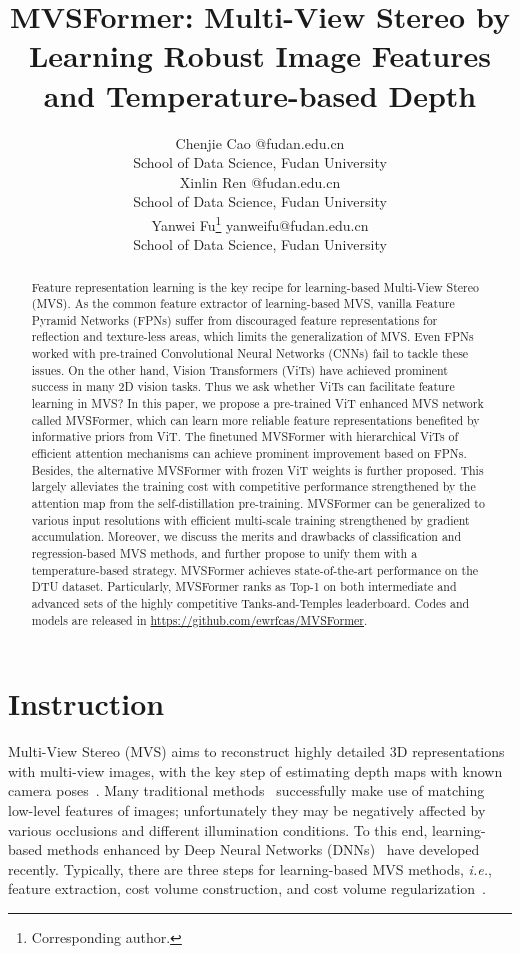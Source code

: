 \documentclass[10pt]{article} \usepackage[preprint]{tmlr}
\title{MVSFormer: Multi-View Stereo by Learning Robust Image Features and Temperature-based Depth}
\author{\name Chenjie Cao \email 20110980001@fudan.edu.cn \\
        \addr School of Data Science, Fudan University \\
        \AND
        \name Xinlin Ren \email 20110240015@fudan.edu.cn \\
        \addr School of Data Science, Fudan University \\
        \AND
        \name Yanwei Fu\thanks{Corresponding author.} \email yanweifu@fudan.edu.cn\\
        \addr School of Data Science, Fudan University}
\begin{document}
\maketitle

\begin{abstract}
Feature representation learning is the key recipe for learning-based Multi-View Stereo (MVS). As the common feature extractor of learning-based MVS, vanilla Feature Pyramid Networks (FPNs) suffer from discouraged feature representations for reflection and texture-less areas, which limits the generalization of MVS. Even FPNs worked with pre-trained Convolutional Neural Networks (CNNs) fail to tackle these issues. On the other hand, Vision Transformers (ViTs) have achieved prominent success in many 2D vision tasks. Thus we ask whether ViTs can facilitate feature learning in MVS? In this paper, we propose a pre-trained ViT enhanced MVS network called MVSFormer, which can learn more reliable feature representations benefited by informative priors from ViT. 
The finetuned MVSFormer with hierarchical ViTs of efficient attention mechanisms can achieve prominent improvement based on FPNs.
Besides, the alternative MVSFormer with frozen ViT weights is further proposed. This largely alleviates the training cost with competitive performance strengthened by the attention map from the self-distillation pre-training.
MVSFormer can be generalized to various input resolutions with efficient multi-scale training strengthened by gradient accumulation. 
Moreover, we discuss the merits and drawbacks of classification and regression-based MVS methods, and further propose to unify them with a temperature-based strategy. MVSFormer achieves state-of-the-art performance on the DTU dataset. Particularly, MVSFormer ranks as Top-1 on both intermediate and advanced sets of the highly competitive Tanks-and-Temples leaderboard. Codes and models are released in \url{https://github.com/ewrfcas/MVSFormer}.
\end{abstract}


\section{Instruction}

Multi-View Stereo (MVS) aims to reconstruct highly detailed 3D representations with multi-view images, with the key step of estimating depth maps with known camera poses~\citep{furukawa2015multi}.
Many traditional methods~\citep{barnes2009patchmatch,furukawa2009accurate,Galliani_2015_ICCV,schonberger2016pixelwise} successfully make use of matching low-level features of images;
unfortunately they may be negatively affected by  various occlusions and different illumination conditions. 
To this end, learning-based methods enhanced by Deep Neural Networks (DNNs)~\citep{ji2017surfacenet,yao2018mvsnet,gu2020cascade,giang2021curvature,wei2021aa} have developed recently.  
Typically, there are three steps for learning-based MVS methods, \emph{i.e.}, feature extraction, cost volume construction, and cost volume regularization~\citep{yao2018mvsnet}.
\end{document}
